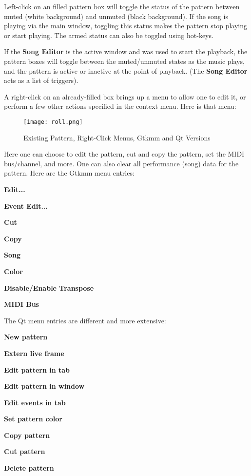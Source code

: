    Left-click on an filled pattern box will toggle the status of the
   pattern between muted (white background) and unmuted (black background).
   If the song is playing via the main window, toggling this status makes
   the pattern stop playing or start playing.  The armed status
   can also be toggled using hot-keys.

   If the \textbf{Song Editor} is the active window and was used to
   start the playback, the pattern boxes will toggle between the muted/unmuted
   states as the music plays, and the pattern is active or inactive at the
   point of playback.  (The \textbf{Song Editor} acts as a list of triggers).

   A right-click on an already-filled box brings up a menu
   to allow one to edit it, or perform a few other actions
   specified in the context menu.  Here is that menu:

\begin{figure}[H]
   \centering 
   \texttt{[image: roll.png]}
   \caption{Existing Pattern, Right-Click Menus, Gtkmm and Qt Versions}
   \label{fig:pattern_window_right_click}
\end{figure}

   Here one can choose to edit the pattern, cut and copy the pattern,
   set the MIDI bus/channel, and more.
   One can also clear all performance (song) data for the pattern.
   Here are the Gtkmm menu entries:
   
   \begin{enumber}
      \item \textbf{Edit...}
      \item \textbf{Event Edit...}
      \item \textbf{Cut}
      \item \textbf{Copy}
      \item \textbf{Song}
      \item \textbf{Color}
      \item \textbf{Disable/Enable Transpose}
      \item \textbf{MIDI Bus}
   \end{enumber}

   The Qt menu entries are different and more extensive:
   
   \begin{enumber}
      \item \textbf{New pattern}
      \item \textbf{Extern live frame}
      \item \textbf{Edit pattern in tab}
      \item \textbf{Edit pattern in window}
      \item \textbf{Edit events in tab}
      \item \textbf{Set pattern color}
      \item \textbf{Copy pattern}
      \item \textbf{Cut pattern}
      \item \textbf{Delete pattern}
   \end{enumber}


